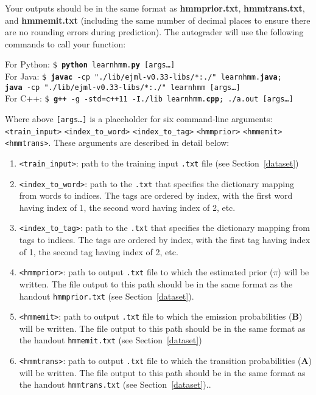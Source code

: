 \documentclass[11pt,addpoints,answers]{exam}
\begin{document}
Your outputs should be in the same format as \textbf{hmmprior.txt}, \textbf{hmmtrans.txt}, and \textbf{hmmemit.txt} (including the same number of decimal places to ensure there are no rounding errors during prediction). The autograder will use the following commands to call your function:

\begin{tabbing}
For Python: \=\texttt{\$ \textbf{python} learnhmm.\textbf{py} [args\dots]}\\

For Java: \>\texttt{\$ \textbf{javac} -cp "./lib/ejml-v0.33-libs/*:./" learnhmm.\textbf{java};}\\
\>\texttt{\textbf{java} -cp "./lib/ejml-v0.33-libs/*:./" learnhmm [args\dots]}\\

For C++: \>\texttt{\$ \textbf{g++} -g -std=c++11 -I./lib learnhmm.\textbf{cpp}; ./a.out [args\dots]}\\
\end{tabbing}

Where above \texttt{[args\dots]} is a placeholder for six command-line arguments:\texttt{<train\_input>} \texttt{<index\_to\_word>} \texttt{<index\_to\_tag>} \texttt{<hmmprior>} \texttt{<hmmemit>} \texttt{<hmmtrans>}. These arguments are described in detail below:
\begin{enumerate}
    \item \texttt{<train\_input>}: path to the training input \texttt{.txt} file (see Section~\ref{dataset})
    \item \texttt{<index\_to\_word>}: path to the \texttt{.txt} that specifies the dictionary mapping from words to indices. The tags are ordered by index, with the first word having index of 1, the second word having index of 2, etc.
    \item \texttt{<index\_to\_tag>}: path to the \texttt{.txt} that specifies the dictionary mapping from tags to indices. The tags are ordered by index, with the first tag having index of 1, the second tag having index of 2, etc.
    \item \texttt{<hmmprior>}: path to output \texttt{.txt} file to which the estimated prior (\boldmath${\pi}$) will be written. The file output to this path should be in the same format as the handout \texttt{hmmprior.txt} (see Section~\ref{dataset}).
    \item \texttt{<hmmemit>}: path to output \texttt{.txt} file to which the emission probabilities ($\mathbf B$) will be written. The file output to this path should be in the same format as the handout \texttt{hmmemit.txt} (see Section~\ref{dataset})
    \item \texttt{<hmmtrans>}: path to output \texttt{.txt} file to which the transition probabilities ($\mathbf A$) will be written. The file output to this path should be in the same format as the handout \texttt{hmmtrans.txt} (see Section~\ref{dataset})..
\end{enumerate}
\end{document}
